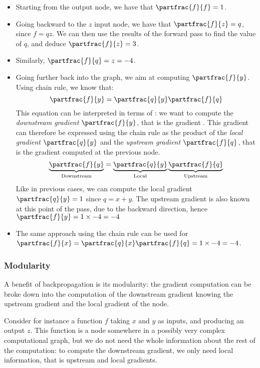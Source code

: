 \begin{itemize}
    \item Starting from the output node, we have that $\partfrac{f}{f}=1$.
    \item Going backward to the $z$ input node, we have that $\partfrac{f}{z}=q$, since $f=qz$. We can then use the results of the forward pass to find the value of $q$, and deduce $\partfrac{f}{z}=3$.
    \item Similarly, $\partfrac{f}{q}=z=-4$.
    \item Going further back into the graph, we aim at computing $\partfrac{f}{y}$. Using chain rule, we know that:
    \begin{equation*}
        \partfrac{f}{y}=\partfrac{q}{y}\partfrac{f}{q}
    \end{equation*}
    This equation can be interpreted in terms of : we want to compute the \emph{downstream gradient} $\partfrac{f}{y}$, that is the gradient . This gradient can therefore be expressed using the chain rule as the product of the \emph{local gradient} $\partfrac{q}{y}$ and the \emph{upstream gradient} $\partfrac{f}{q}$, that is the gradient computed at the previous node.
    \begin{equation*}
        \underbrace{\partfrac{f}{y}}_{\textnormal{Downstream}}=\underbrace{\partfrac{q}{y}}_{\textnormal{Local}} \underbrace{\partfrac{f}{q}}_{\textnormal{Upstream}}
    \end{equation*}
    Like in previous cases, we can compute the local gradient $\partfrac{q}{y}=1$ since $q=x+y$. The upstream gradient is also known at this point of the pass, due to the backward direction, hence $\partfrac{f}{y}=1\times-4=-4$
    \item The same approach using the chain rule can be used for $\partfrac{f}{x}=\partfrac{q}{x}\partfrac{f}{q}=1\times -4=-4$.
\end{itemize}

\subsubsection{Modularity}
A benefit of backpropagation is its modularity: the gradient computation can be broke down into the computation of the downstream gradient knowing the upstream gradient and the local gradient of the node. 

Consider for instance a function $f$ taking $x$ and $y$ as inputs, and producing an output $z$. This function is a node somewhere in a possibly very complex computational graph, but we do not need the whole information about the rest of the computation: to compute the downstream gradient, we only need local information, that is upstream and local gradients. 

